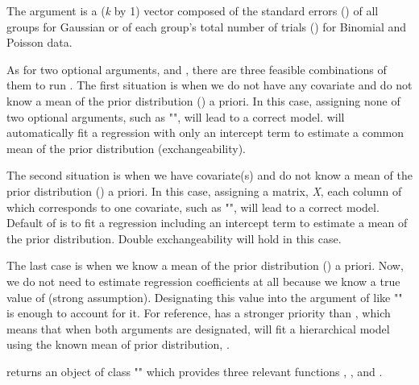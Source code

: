 \documentclass[a4paper]{book}
\begin{document}
\begin{Details}
The argument  is a (\emph{k} by 1) vector composed of the standard errors () of all groups for Gaussian or of each group's total number of trials () for Binomial and Poisson data.

As for two optional arguments,  and , there are three feasible 
combinations of them to run . The first situation is when we do not have any covariate and do not 
know a mean of the prior distribution () a priori. In this case, assigning none of two
optional arguments, such as "", will lead to a correct model.  
will automatically fit a regression with only an intercept term to estimate a common mean of the prior
distribution (exchangeability).

The second situation is when we have covariate(s) and do not know a mean of the prior distribution () a priori. In this case, assigning a matrix, \emph{X}, each column of which corresponds to one covariate, such as "", will lead to a correct model. Default of  is to fit a regression including an intercept term to estimate a mean of the prior distribution. Double exchangeability will hold in this case.

The last case is when we know a mean of the prior distribution () a priori. Now, we do
not need to estimate regression coefficients at all because we know a true value of  (strong assumption).
Designating this value into the argument of  like 
"" is enough to account for it. For reference, 
 has a stronger priority than , which means that when both
arguments are designated,  will fit a hierarchical model using the known mean of prior distribution, .

 returns an object of class "" which provides three relevant functions , , and .
\end{Details}
%
\end{document}
